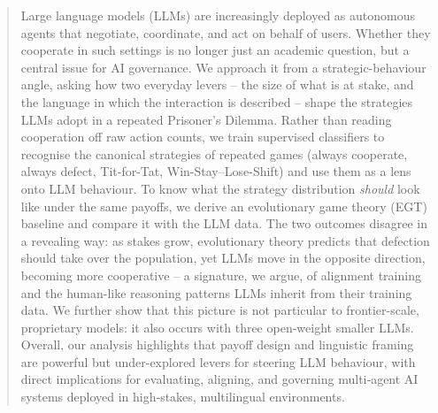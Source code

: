\documentclass[a4paper,fleqn]{cas-sc}
\begin{document}
\author[2,3]{Le Hong Trang}
\cormark[1]
\credit{}

\author[5]{The Anh Han}
\cormark[1]
\credit{}







\begin{abstract}
Large language models (LLMs) are increasingly deployed as autonomous agents that negotiate, coordinate, and act on behalf of users. Whether they cooperate in such settings is no longer just an academic question, but a central issue for AI  governance. We approach it from a strategic-behaviour angle, asking how two everyday levers -- the size of what is at stake, and the language in which the interaction is described -- shape the strategies LLMs adopt in a repeated Prisoner's Dilemma. Rather than reading cooperation off raw action counts, we train supervised classifiers to recognise the canonical strategies of repeated games  (always cooperate, always defect, Tit-for-Tat, Win-Stay--Lose-Shift) and use them as a lens onto LLM behaviour. To know what the strategy distribution \emph{should} look like under the same payoffs, we derive an evolutionary game theory (EGT) baseline and compare it with the LLM data. The two outcomes disagree in a revealing way: as stakes grow, evolutionary theory predicts that defection should take over the population, yet LLMs move in the opposite direction, becoming more cooperative -- a signature, we argue, of alignment training and the human-like reasoning patterns LLMs inherit from their training data. We further show that this picture is not particular to frontier-scale, proprietary models: it also occurs  with three open-weight smaller LLMs. 
Overall, our analysis highlights that payoff design and linguistic framing are powerful but under-explored levers for steering LLM behaviour, with direct implications for evaluating, aligning, and governing multi‑agent AI systems deployed in high‑stakes, multilingual environments.
\end{abstract}
\end{document}
